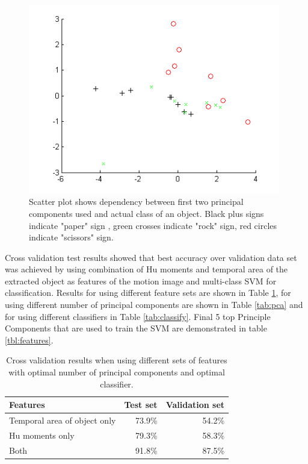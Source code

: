 

\begin{figure}
\begin{center}
\includegraphics[width=110mm]{paclassplot.png}
\caption{Scatter plot shows dependency between first two principal components used and actual class of an object. Black plus signs indicate "paper" sign , green crosses indicate "rock" sign, red circles indicate "scissors" sign. }
\label{fig:paclassplot}
\end{center}
\end{figure}

Cross validation test results showed that best accuracy over validation data set was achieved by using combination of Hu moments and temporal area of the extracted object as features of the motion image and multi-class SVM for classification. Results for using different feature sets are shown in Table \ref{tab:features}, for using different number of principal components are shown in Table \ref{tab:pca} and for using different classifiers in Table \ref{tab:classify}. Final 5 top Principle Components that are used to train the SVM are demonstrated in table \ref{tbl:features}. 



\begin{table}
\begin{center}
\begin{tabular}{| l | r | r |}
\hline
Features & Test set & Validation set \\ \hline
Temporal area of object only & 73.9\% & 54.2\% \\
Hu moments only & 79.3\% & 58.3\% \\
Both & 91.8\% & 87.5\% \\
\hline
\end{tabular}
\end{center}
\caption{Cross validation results when using different sets of features with optimal number of principal components and optimal classifier.}
\label{tab:features}
\end{table}


